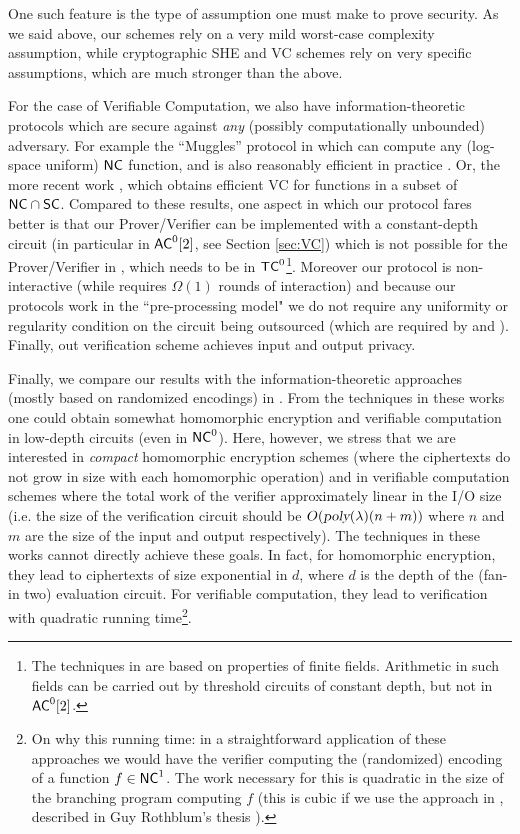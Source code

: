 One such feature is the type of assumption one must make to prove security. As we said above, our schemes rely on a very mild worst-case complexity assumption, while cryptographic SHE and VC schemes rely on very specific assumptions, which are much stronger than the above. 

For the case of Verifiable Computation, we also have information-theoretic
protocols which are secure against {\em any} (possibly computationally unbounded) adversary. For example the ``Muggles'' protocol in \cite{muggles} which 
can compute any (log-space uniform) ${\mathsf{NC}}$ function, 
and is also reasonably efficient
in practice \cite{CMT}.
Or, the more recent work \cite{grlocally}, which obtains efficient VC for functions in a subset of ${\mathsf{NC}} \cap {\ensuremath{\mathsf{SC}}}$.
Compared to these results, one aspect in which our protocol fares better  is that
our Prover/Verifier can be implemented with a constant-depth circuit (in particular in 
${\mathsf{AC}}^0[2]$, see Section \ref{sec:VC}) which is not possible for the Prover/Verifier in \cite{muggles,grlocally}, which needs to be in ${\mathsf{TC}}^0$\footnote{The techniques in  \cite{muggles,grlocally} are based on properties of finite fields. Arithmetic in such fields can be carried out by threshold circuits of constant depth, but not in ${\mathsf{AC}}^0[2]$.}. Moreover our protocol is non-interactive (while \cite{muggles,grlocally} requires
$\Omega(1)$ rounds of interaction) and because our protocols work in the ``pre-processing model" we do not require any uniformity or regularity condition on the circuit being outsourced (which are required by \cite{muggles} and \cite{CMT}). Finally, out verification scheme achieves input and output privacy.

Finally, we compare our results with the information-theoretic approaches (mostly based on randomized encodings) in  \cite{gghkr07,re,cryptoNC0,SYY}. From the techniques in these works one could obtain somewhat homomorphic encryption and verifiable computation in low-depth circuits (even in ${\mathsf{NC}}^0$). Here, however, we stress that we are interested in \textit{compact} homomorphic encryption schemes (where the ciphertexts do not grow in size with each homomorphic operation) and in verifiable computation schemes where the total work of the verifier approximately linear in the I/O size (i.e. the size of the verification circuit should be $O({\textsl{poly}}(\lambda)(n+m))$ where $n$ and $m$ are the size of the input and output respectively). The techniques in these works cannot directly achieve these goals. In fact, for homomorphic encryption, they lead to ciphertexts of size exponential in $d$, where $d$ is the depth of the (fan-in two) evaluation circuit. For verifiable computation, they  lead to verification with quadratic running time\footnote{On why this running time: in a straightforward application of these approaches we would have the verifier computing the (randomized) encoding of a function $f \in {\ensuremath{\mathsf{NC}}}^1$. The work necessary for this is quadratic in the size of the branching program computing $f$ \cite{re} (this is  cubic if we use the approach in \cite{gghkr07}, described in Guy Rothblum's thesis \cite{rothblum2009delegating}).}. 

